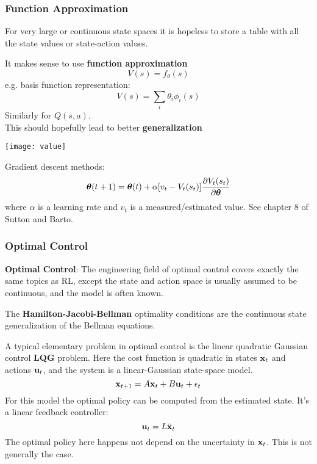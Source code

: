 \begin{frame}
\frametitle{Function Approximation}

For very large or continuous state spaces it is hopeless to store a
table with all the state values or state-action values.

\parbox{2.7in}{
It makes sense to use {\bf function approximation}\\[-1ex]
\[
V(s) = f_\theta(s)
\]
e.g. basis function representation: \\[-1ex]
\[
V(s) = \sum_i \theta_i \phi_i(s)
\]
Similarly for $Q(s,a)$.\\[1ex]
This should hopefully lead to better {\bf generalization}}
\parbox{2.0in}{
\centerline{\texttt{[image: value]}}}

\vspace{1.5ex}

Gradient descent methods:\\[-1ex]
\[
\boldsymbol{\theta}(t+1) = \boldsymbol{\theta}(t) + \alpha [v_t - V_t(s_t)] \frac{\partial
V_t(s_t)}{\partial {\boldsymbol{\theta}}}
\]
where $\alpha$ is a learning rate and $v_t$ is a measured/estimated
value. See chapter 8 of Sutton and Barto.
\end{frame}

\begin{frame}
\frametitle{Optimal Control}

{\bf Optimal Control}: The engineering field of optimal control covers
exactly the same topics as RL, except the state and action space is
usually assumed to be continuous, and the model is often known.

The {\bf Hamilton-Jacobi-Bellman} optimality conditions
are the continuous state generalization of the Bellman equations.

A typical elementary problem in optimal control is the linear
quadratic Gaussian control {\bf LQG} problem. Here the cost function
is quadratic in states ${\mathbf x}_t$  and actions ${\mathbf u}_t$, and the system is a
linear-Gaussian state-space model. 
\[
{\mathbf x}_{t+1} = A {\mathbf x}_t + B {\mathbf u}_t + \epsilon_t
\]
For this model the optimal policy
can be computed from the estimated state. It's a linear feedback
controller:
\[
{\mathbf u}_t = L \hat{{\mathbf x}}_t
\]
The optimal policy here happens not depend on the uncertainty in
${\mathbf x}_t$. This is not generally the case.
\end{frame}

